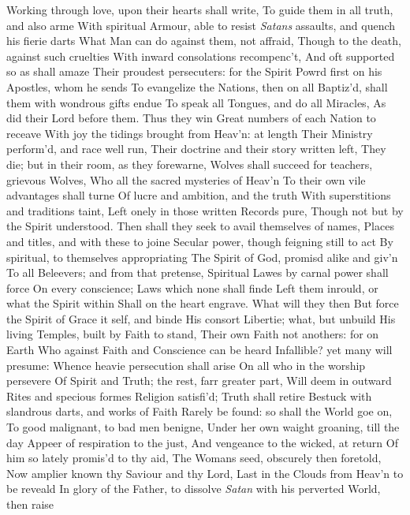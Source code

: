 \documentclass[11pt]{book}
\newcounter {first}
\begin{document}
Working through love, upon their hearts shall write, 
To guide them in all truth, and also arme 
With spiritual Armour, able to resist 
\textit{Satans} assaults, and quench his fierie darts 
What Man can do against them, not affraid, 
Though to the death, against such cruelties 
With inward consolations recompenc't, 
And oft supported so as shall amaze 
Their proudest persecuters: for the Spirit 
Powrd first on his Apostles, whom he sends 
To evangelize the Nations, then on all 
Baptiz'd, shall them with wondrous gifts endue 
To speak all Tongues, and do all Miracles, 
As did their Lord before them.  Thus they win 
Great numbers of each Nation to receave 
With joy the tidings brought from Heav'n: at length 
Their Ministry perform'd, and race well run, 
Their doctrine and their story written left, 
They die; but in their room, as they forewarne, 
Wolves shall succeed for teachers, grievous Wolves, 
Who all the sacred mysteries of Heav'n 
To their own vile advantages shall turne 
Of lucre and ambition, and the truth 
With superstitions and traditions taint, 
Left onely in those written Records pure, 
Though not but by the Spirit understood. 
Then shall they seek to avail themselves of names, 
Places and titles, and with these to joine 
Secular power, though feigning still to act 
By spiritual, to themselves appropriating 
The Spirit of God, promisd alike and giv'n 
To all Beleevers; and from that pretense, 
Spiritual Lawes by carnal power shall force 
On every conscience; Laws which none shall finde 
Left them inrould, or what the Spirit within 
Shall on the heart engrave.  What will they then 
But force the Spirit of Grace it self, and binde 
His consort Libertie; what, but unbuild 
His living Temples, built by Faith to stand, 
Their own Faith not anothers: for on Earth 
Who against Faith and Conscience can be heard 
Infallible? yet many will presume: 
Whence heavie persecution shall arise 
On all who in the worship persevere 
Of Spirit and Truth; the rest, farr greater part, 
Will deem in outward Rites and specious formes 
Religion satisfi'd; Truth shall retire 
Bestuck with slandrous darts, and works of Faith 
Rarely be found: so shall the World goe on, 
To good malignant, to bad men benigne, 
Under her own waight groaning, till the day 
Appeer of respiration to the just, 
And vengeance to the wicked, at return 
Of him so lately promis'd to thy aid, 
The Womans seed, obscurely then foretold, 
Now amplier known thy Saviour and thy Lord, 
Last in the Clouds from Heav'n to be reveald 
In glory of the Father, to dissolve 
\textit{Satan} with his perverted World, then raise 
\end{document}
